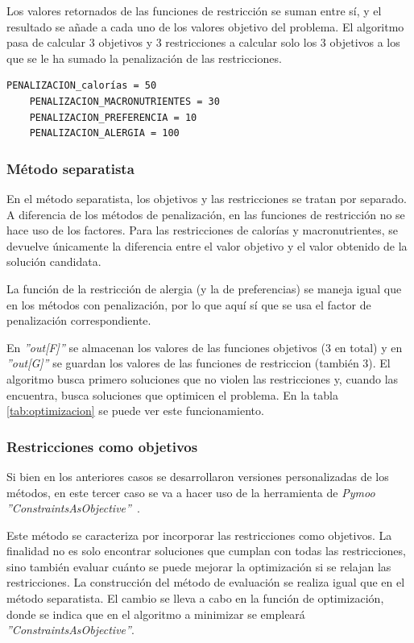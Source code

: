 Los valores retornados de las funciones de restricción se suman entre sí, y el resultado se añade a cada uno de los valores objetivo del problema. El algoritmo pasa de calcular 3 objetivos y 3 restricciones a calcular solo los 3 objetivos a los que se le ha sumado la penalización de las restricciones.

\begin{lstlisting}[basicstyle=\ttfamily, caption=Factores de penalización.,label={lst:factores}]
    PENALIZACION_calorías = 50
    PENALIZACION_MACRONUTRIENTES = 30
    PENALIZACION_PREFERENCIA = 10
    PENALIZACION_ALERGIA = 100
\end{lstlisting}

\subsubsection{Método separatista}
\label{ch:metodo-separatista}

En el método separatista, los objetivos y las restricciones se tratan por separado. A diferencia de los métodos de penalización, en las funciones de restricción no se hace uso de los factores. Para las restricciones de calorías y macronutrientes, se devuelve únicamente la diferencia entre el valor objetivo y el valor obtenido de la solución candidata.

La función de la restricción de alergia (y la de preferencias) se maneja igual que en los métodos con penalización, por lo que aquí sí que se usa el factor de penalización correspondiente.

En \textit{''out[F]''} se almacenan los valores de las funciones objetivos (3 en total) y en \textit{''out[G]''} se guardan los valores de las funciones de restriccion (también 3). El algoritmo busca primero soluciones que no violen las restricciones y, cuando las encuentra, busca soluciones que optimicen el problema. En la tabla \ref{tab:optimizacion} se puede ver este funcionamiento.

\subsubsection{Restricciones como objetivos}
\label{ch:restricciones-objetivo}

Si bien en los anteriores casos se desarrollaron versiones personalizadas de los métodos, en este tercer caso se va a hacer uso de la herramienta de \textit{Pymoo} \textit{''ConstraintsAsObjective''}~\cite{pymoo_constraints_as_obj}.

Este método se caracteriza por incorporar las restricciones como objetivos. La finalidad no es solo encontrar soluciones que cumplan con todas las restricciones, sino también evaluar cuánto se puede mejorar la optimización si se relajan las restricciones. La construcción del método de evaluación se realiza igual que en el método separatista. El cambio se lleva a cabo en la función de optimización, donde se indica que en el algoritmo a minimizar se empleará \textit{''ConstraintsAsObjective''}.
